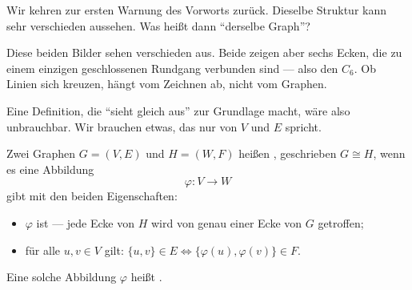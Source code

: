 Wir kehren zur ersten Warnung des Vorworts zurück. Dieselbe Struktur kann sehr verschieden aussehen. Was heißt dann \enquote{derselbe Graph}?

\begin{merksatz}
\begin{center}
\end{center}

Diese beiden Bilder sehen verschieden aus. Beide zeigen aber sechs Ecken, die zu einem einzigen geschlossenen Rundgang verbunden sind --- also den $C_6$. Ob Linien sich kreuzen, hängt vom Zeichnen ab, nicht vom Graphen.

Eine Definition, die \enquote{sieht gleich aus} zur Grundlage macht, wäre also unbrauchbar. Wir brauchen etwas, das nur von $V$ und $E$ spricht.
\end{merksatz}

\begin{definition}
Zwei Graphen $G = (V,E)$ und $H = (W,F)$ heißen , geschrieben $G \cong H$, wenn es eine Abbildung
\[ \varphi : V \longrightarrow W \]
gibt mit den beiden Eigenschaften:
\begin{itemize}[leftmargin=1.4em, itemsep=3pt]
\item $\varphi$ ist  --- jede Ecke von $H$ wird von genau einer Ecke von $G$ getroffen;
\item für alle $u, v \in V$ gilt: $\{u,v\} \in E \iff \{\varphi(u), \varphi(v)\} \in F$.
\end{itemize}
Eine solche Abbildung $\varphi$ heißt .
\end{definition}

